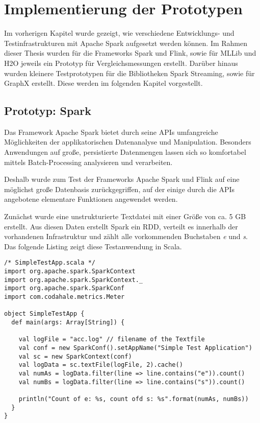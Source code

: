 \chapter{Implementierung der Prototypen }
\label{chapter:implementierung}



Im vorherigen Kapitel wurde gezeigt, wie verschiedene Entwicklungs- und Testinfrastrukturen mit Apache Spark aufgesetzt werden können. Im Rahmen dieser Thesis wurden für die Frameworks Spark und Flink, sowie für MLLib und H2O jeweils ein Prototyp für Vergleichsmessungen erstellt. Darüber hinaus wurden kleinere Testprototypen für die Bibliotheken Spark Streaming, sowie für GraphX erstellt. Diese werden im folgenden Kapitel vorgestellt.  

\section{Prototyp: Spark}
\label{section:prototyp spark}

Das Framework Apache Spark bietet durch seine APIs umfangreiche Möglichkeiten der applikatorischen Datenanalyse und Manipulation. Besonders Anwendungen auf große, persistierte Datenmengen lassen sich so komfortabel mittels Batch-Processing analysieren und verarbeiten. 

Deshalb wurde zum Test der Frameworks Apache Spark und Flink auf eine möglichst große Datenbasis zurückgegriffen, auf der einige durch die APIs angebotene elementare Funktionen angewendet werden.  

Zunächst wurde eine unstrukturierte Textdatei mit einer Größe von ca. 5 GB erstellt. Aus diesen Daten erstellt Spark ein RDD, verteilt es innerhalb der vorhandenen Infrastruktur und zählt alle vorkommenden Buchstaben \textit{e} und \textit{s}. 
Das folgende Listing zeigt diese Testanwendung in Scala.

\newpage

\begin{lstlisting}[label=vwikilogs,caption=SimpleTestApp.scala - zählt Buchstabenvorkommen in Textdateien.]
 /* SimpleTestApp.scala */
import org.apache.spark.SparkContext
import org.apache.spark.SparkContext._
import org.apache.spark.SparkConf
import com.codahale.metrics.Meter

object SimpleTestApp {
  def main(args: Array[String]) {

    val logFile = "acc.log" // filename of the Textfile
    val conf = new SparkConf().setAppName("Simple Test Application")
    val sc = new SparkContext(conf)
    val logData = sc.textFile(logFile, 2).cache()
    val numAs = logData.filter(line => line.contains("e")).count()
    val numBs = logData.filter(line => line.contains("s")).count()
    
    println("Count of e: %s, count ofd s: %s".format(numAs, numBs))
  }
}
\end{lstlisting}

